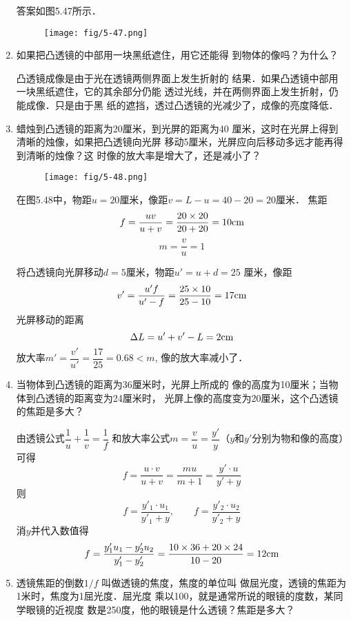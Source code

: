 \begin{enumerate}
\begin{solution}
    答案如图5.47所示．
    \begin{figure}[htp]
        \centering
        \texttt{[image: fig/5-47.png]}
        \caption{}
    \end{figure}
\end{solution}
\item 如果把凸透镜的中部用一块黑纸遮住，用它还能得
到物体的像吗？为什么？

\begin{solution}
凸透镜成像是由于光在透镜两侧界面上发生折射的
结果．如果凸透镜中部用一块黑纸遮住，它的其余部分仍能
透过光线，并在两侧界面上发生折射，仍能成像．只是由于黑
纸的遮挡，透过凸透镜的光减少了，成像的亮度降低．
\end{solution}
\item 蜡烛到凸透镜的距离为20厘米，到光屏的距离为40
厘米，这时在光屏上得到清晰的烛像，如果把凸透镜向光屏
移动5厘米，光屏应向后移动多远才能再得到清晰的烛像？这
时像的放大率是增大了，还是减小了？

\begin{solution}
    \begin{figure}[htp]
        \centering
        \texttt{[image: fig/5-48.png]}
        \caption{}
    \end{figure}

    在图5.48中，物距$u=20$厘米，像距$v=L-u=40-20=20$厘米．
    焦距
\[f=\frac{uv}{u+v}=\frac{20\times 20}{20+20}=10{\rm cm}\]
\[m=\frac{v}{u}=1\]

将凸透镜向光屏移动$d=5$厘米，物距$u'=u+d=25$
厘米，像距
\[v'=\frac{u'f}{u'-f}=\frac{25\times 10 }{25-10}=17{\rm cm}\]
光屏移动的距离
\[\Delta L=u'+v'-L=2{\rm cm}\]
放大率$m'=\dfrac{v'}{u'}=\dfrac{17}{25}=0.68<m$, 像的放大率减小了．
\end{solution}
\item 当物体到凸透镜的距离为36厘米时，光屏上所成的
像的高度为10厘米；当物体到凸透镜的距离变为24厘米时，
光屏上像的高度变为20厘米，这个凸透镜的焦距是多大？

\begin{solution}
    由透镜公式$\dfrac{1}{u}+\dfrac{1}{v}=\dfrac{1}{f}$
    和放大率公式$m=\dfrac{v}{u}=\dfrac{y'}{y}$（$y$和$y'$分别为物和像的高度）可得
\[f=\frac{u\cdot v}{u+v}=\frac{mu}{m+1}=\frac{y'\cdot u}{y'+y}\]
则
\[f=\frac{y'_1\cdot u_1}{y'_1+y},\qquad f=\frac{y'_2\cdot u_2}{y'_2+y}\]
消$y$并代入数值得
\[f=\frac{y'_1u_1-y'_2u_2}{y'_1-y'_2}=\frac{10\times 36+20\times 24}{10-20}=12{\rm cm}\]
\end{solution}
\item 透镜焦距的倒数$1/f$
叫做透镜的焦度，焦度的单位叫
做屈光度，透镜的焦距为1米时，焦度为1屈光度．屈光度
乘以100，就是通常所说的眼镜的度数，某同学眼镜的近视度
数是250度，他的眼镜是什么透镜？焦距是多大？


\end{enumerate}
